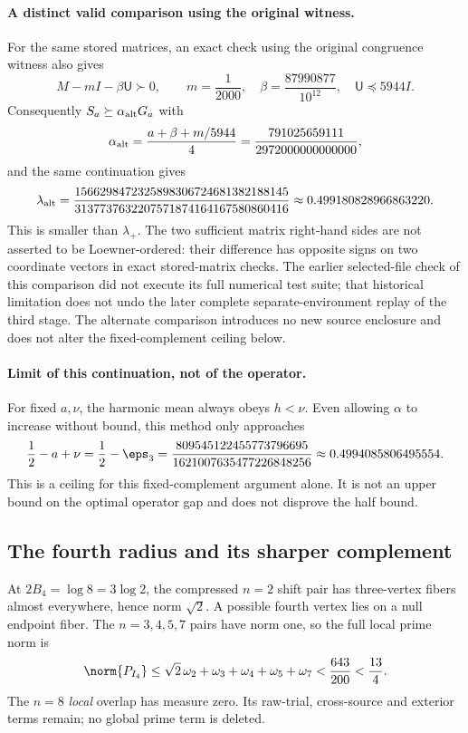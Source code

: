 \documentclass[11pt,a4paper]{article}
\numberwithin{equation}{section}
\theoremstyle{definition}\newtheorem{definition}[theorem]{Definition}
\theoremstyle{remark}\newtheorem{remark}[theorem]{Remark}
\begin{document}
\paragraph{A distinct valid comparison using the original witness.}
For the same stored matrices, an exact check using the original congruence witness also gives
\[
 M-mI-\beta\mathsf U\succ0,\qquad
 m=\frac1{2000},\quad \beta=\frac{87990877}{10^{12}},\quad
 \mathsf U\preceq5944I.
\]
Consequently $S_a\succeq\alpha_{\rm alt}G_a$ with
\[
 \alpha_{\rm alt}=\frac{a+\beta+m/5944}{4}
 =\frac{791025659111}{2972000000000000},
\]
and the same continuation gives
\[
 \lambda_{\rm alt}=
 \frac{1566298472325898306724681382188145}
 {3137737632207571874164167580860416}
 \approx0.499180828966863220.
\]
This is smaller than $\lambda_+$. The two sufficient matrix right-hand sides are not asserted to be Loewner-ordered: their difference has opposite signs on two coordinate vectors in exact stored-matrix checks. The earlier selected-file check of this comparison did not execute its full numerical test suite; that historical limitation does not undo the later complete separate-environment replay of the third stage. The alternate comparison introduces no new source enclosure and does not alter the fixed-complement ceiling below.

\paragraph{Limit of this continuation, not of the operator.}
For fixed \(a,\nu\), the harmonic mean always obeys \(h<\nu\).
Even allowing \(\alpha\) to increase without bound, this method only
approaches
\[
\frac12-a+\nu=\frac12-\eps_3
 =\frac{809545122455773796695}{1621007635477226848256}
 \approx0.4994085806495554.
\]
This is a ceiling for this fixed-complement argument alone. It is not an
upper bound on the optimal operator gap and does not disprove the half bound.


\subsection{The fourth radius and its sharper complement}\label{vrg:sec:fourth}
At \(2B_4=\log8=3\log2\), the compressed \(n=2\) shift pair has
three-vertex fibers almost everywhere, hence norm \(\sqrt2\).
A possible fourth vertex lies on a null endpoint fiber. The \(n=3,4,5,7\)
pairs have norm one, so the full local prime norm is
\[
\norm{P_{I_4}}\leq\sqrt2\,\omega_2+\omega_3+\omega_4+\omega_5+\omega_7
 <\frac{643}{200}<\frac{13}{4}.
\]
The \(n=8\) \emph{local} overlap has measure zero. Its raw-trial,
cross-source and exterior terms remain; no global prime term is deleted.
\end{document}
